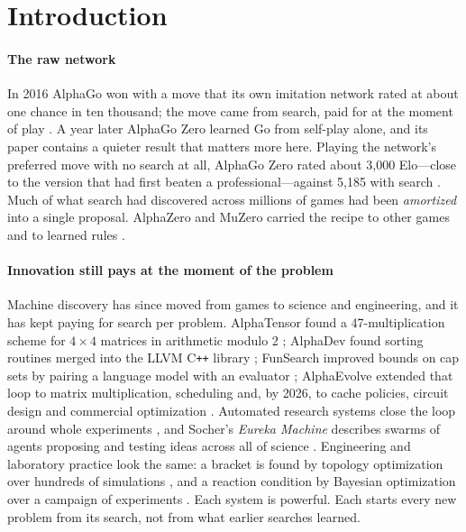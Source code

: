 \section{Introduction}
\label{sec:intro}

\paragraph{The raw network} In 2016 AlphaGo won with a move that its own imitation network rated at
about one chance in ten thousand; the move came from search, paid for at the moment of play
\citep{silver2016alphago,hassabis2016seoul}. A year later AlphaGo Zero learned Go from self-play
alone, and its paper contains a quieter result that matters more here. Playing the network's
preferred move with no search at all, AlphaGo Zero rated about 3,000 Elo---close to the version that
had first beaten a professional---against 5,185 with search \citep{silver2017zero}. Much of what search
had discovered across millions of games had been \emph{amortized} into a single proposal. AlphaZero
and MuZero carried the recipe to other games and to learned rules
\citep{silver2018alphazero,schrittwieser2020muzero}.

\paragraph{Innovation still pays at the moment of the problem} Machine discovery has since moved from
games to science and engineering, and it has kept paying for search per problem. AlphaTensor found a
47-multiplication scheme for $4\times4$ matrices in arithmetic modulo 2 \citep{fawzi2022alphatensor};
AlphaDev found sorting routines merged into the LLVM C\texttt{++} library \citep{mankowitz2023alphadev};
FunSearch improved bounds on cap sets by pairing a language model with an evaluator
\citep{romeraparedes2024funsearch}; AlphaEvolve extended that loop to matrix multiplication,
scheduling and, by 2026, to cache policies, circuit design and commercial optimization
\citep{novikov2025alphaevolve,deepmind2026alphaevolve}. Automated research systems close the loop
around whole experiments \citep{lu2024aiscientist,recursive2026flint}, and Socher's \emph{Eureka
Machine} describes swarms of agents proposing and testing ideas across all of science
\citep{socher2026eureka}. Engineering and laboratory practice look the same: a bracket is found by
topology optimization over hundreds of simulations \citep{sigmund2001topopt}, and a reaction
condition by Bayesian optimization over a campaign of experiments
\citep{snoek2012bo,shields2021reaction}. Each system is powerful. Each starts every new problem from
its search, not from what earlier searches learned.

